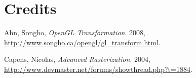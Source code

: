 \documentclass[letterpaper,10pt]{article}
\begin{document}
\section{Credits}







\begin{thebibliography}{4}
Ahn, Songho, 
\emph{OpenGL Transformation}.
2008,
\url{http://www.songho.ca/opengl/gl_transform.html}.

Capens, Nicolas, 
\emph{Advanced Rasterization}.
2004,
\url{http://www.devmaster.net/forums/showthread.php?t=1884}.

\end{thebibliography}
\end{document}
